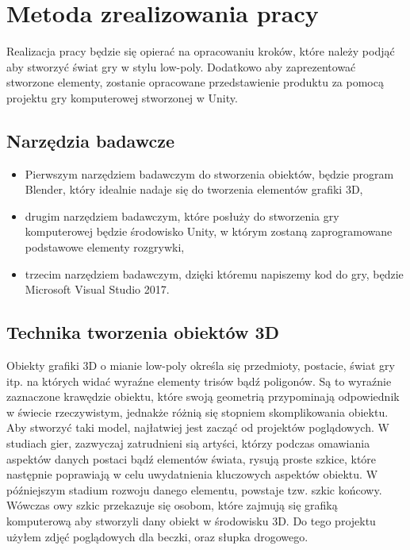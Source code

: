 \chapter{Metoda zrealizowania pracy}
Realizacja pracy będzie się opierać na opracowaniu kroków, które należy podjąć aby stworzyć świat gry w stylu low-poly. Dodatkowo aby zaprezentować stworzone elementy, zostanie opracowane przedstawienie produktu za pomocą projektu gry komputerowej stworzonej w Unity.
\section{Narzędzia badawcze}
\begin{itemize}
\item Pierwszym narzędziem badawczym do stworzenia obiektów, będzie program Blender, który idealnie nadaje się do tworzenia elementów grafiki 3D,

\item drugim narzędziem badawczym, które posłuży do stworzenia gry komputerowej będzie środowisko Unity, w którym zostaną zaprogramowane podstawowe elementy rozgrywki,

\item trzecim narzędziem badawczym, dzięki któremu napiszemy kod do gry, będzie Microsoft Visual Studio 2017.

\end{itemize}

\section{Technika tworzenia obiektów 3D}
\indent Obiekty grafiki 3D o mianie low-poly określa się przedmioty, postacie, świat gry itp. na których widać wyraźne elementy trisów bądź poligonów. Są to wyraźnie zaznaczone krawędzie obiektu, które swoją geometrią przypominają odpowiednik w świecie rzeczywistym, jednakże różnią się stopniem skomplikowania obiektu. Aby stworzyć taki model, najłatwiej jest zacząć od projektów poglądowych. W studiach gier, zazwyczaj zatrudnieni sią artyści, którzy podczas omawiania aspektów danych postaci bądź elementów świata, rysują proste szkice, które następnie poprawiają w celu uwydatnienia kluczowych aspektów obiektu. 
W późniejszym stadium rozwoju danego elementu, powstaje tzw. szkic końcowy. Wówczas owy szkic przekazuje się osobom, które zajmują się grafiką komputerową aby stworzyli dany obiekt w środowisku 3D. Do tego projektu użyłem zdjęć poglądowych dla beczki, oraz słupka drogowego.

